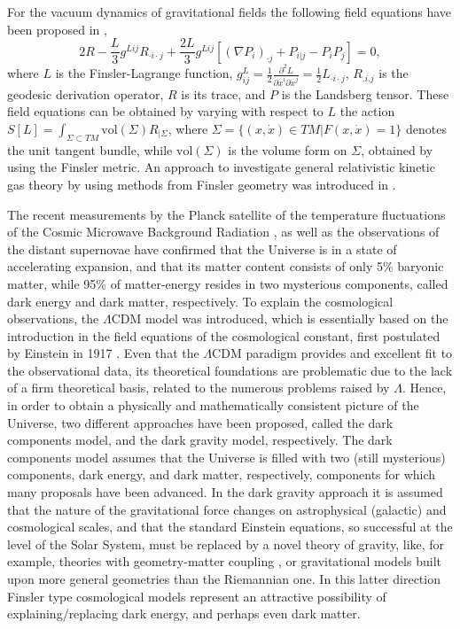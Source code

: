 \documentclass[aps,superscriptaddress, showpacs,preprintnumbers, superscriptaddress, nofootinbibt,twocolumn]{revtex4-2}
\def\be{\begin{equation}}
\def\ee{\end{equation}}
\begin{document}
For the vacuum dynamics of gravitational fields  the following field equations have been proposed in \cite{Voicu1},
\be
2R - \frac{L}{3}g^{Lij}R_{\cdot i \cdot j} + \frac{2L}{3}g^{Lij}\left[ (\nabla P_{i})_{\cdot j} + P_{i|j} - P_{i}P_{j}\right]= 0,
\ee
where $L$ is the Finsler-Lagrange function, $g^L_{ij}=\frac{1}{2}\frac{\partial ^{2}L}{\partial \dot{x}^{i}\partial \dot{x}^{j}}=\frac{1}{2} L_{\cdot i\cdot j}$, $R_{.i.j}$ is the geodesic derivation operator, $R$ is its trace, and $P$ is the Landsberg tensor. These field equations can be obtained by varying with respect to $L$ the action $S[L] = \int_{\Sigma\subset TM} \mathrm{vol}(\Sigma) R_{|\Sigma}$, where $\Sigma = \{(x,\dot x)\in TM|F(x,\dot x) = 1\}$ denotes the unit tangent bundle, while $\mathrm{vol}(\Sigma)$ is the volume form on $\Sigma$, obtained by using the Finsler metric. An approach to investigate general relativistic kinetic gas theory by using methods from Finsler geometry was introduced in \cite{Voicu2}.

The recent measurements by the Planck satellite of the temperature fluctuations of the Cosmic Microwave Background Radiation \cite{1g,1h}, as well as the observations of the distant supernovae \cite{Riess} have confirmed that the Universe is in a state of accelerating expansion, and that its matter content consists of only 5\% baryonic matter, while 95\% of matter-energy resides in two mysterious components, called dark energy and dark matter, respectively. To explain the cosmological observations, the $\Lambda$CDM model was introduced, which is essentially based on the introduction in the field equations of the cosmological constant, first postulated by Einstein in 1917 \cite{Ein}. Even that the $\Lambda$CDM paradigm provides and excellent fit to the observational data, its theoretical foundations are problematic due to the lack of a firm theoretical basis, related to the numerous problems raised by $\Lambda$. Hence, in order to obtain a physically and mathematically consistent picture of the Universe, two different approaches have been proposed, called the dark components model, and the dark gravity model, respectively. The dark components model \cite{Rev1,Rev2,Rev3,Rev4, Rev5} assumes that the Universe is filled with two (still mysterious) components, dark energy, and dark matter, respectively, components for which many proposals have been advanced. In the dark gravity approach it is assumed that the nature of the gravitational force changes on astrophysical (galactic) and cosmological scales, and that the standard Einstein equations, so successful at the level of the Solar System, must be replaced by a novel theory of gravity, like, for example, theories with geometry-matter coupling \cite{e1,e4}, or gravitational models built upon more general geometries than the Riemannian one. In this latter direction Finsler type cosmological models represent an attractive possibility of explaining/replacing dark energy, and perhaps even dark matter.
\end{document}
